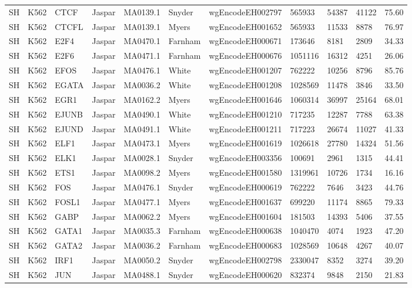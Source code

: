 {\begin{longtable}{p{0.2cm}p{1.1cm}p{1.0cm}p{1.0cm}p{1.0cm}p{1.0cm}p{2.3cm}p{1.0cm}p{0.8cm}p{0.8cm}p{0.8cm}}
SH & K562 & CTCF & Jaspar & MA0139.1 & Snyder & wgEncodeEH002797 & 565933 & 54387 & 41122 & 75.60\\
SH & K562 & CTCFL & Jaspar & MA0139.1 & Myers & wgEncodeEH001652 & 565933 & 11533 & 8878 & 76.97\\
SH & K562 & E2F4 & Jaspar & MA0470.1 & Farnham & wgEncodeEH000671 & 173646 & 8181 & 2809 & 34.33\\
SH & K562 & E2F6 & Jaspar & MA0471.1 & Farnham & wgEncodeEH000676 & 1051116 & 16312 & 4251 & 26.06\\
SH & K562 & EFOS & Jaspar & MA0476.1 & White & wgEncodeEH001207 & 762222 & 10256 & 8796 & 85.76\\
SH & K562 & EGATA & Jaspar & MA0036.2 & White & wgEncodeEH001208 & 1028569 & 11478 & 3846 & 33.50\\
SH & K562 & EGR1 & Jaspar & MA0162.2 & Myers & wgEncodeEH001646 & 1060314 & 36997 & 25164 & 68.01\\
SH & K562 & EJUNB & Jaspar & MA0490.1 & White & wgEncodeEH001210 & 717235 & 12287 & 7788 & 63.38\\
SH & K562 & EJUND & Jaspar & MA0491.1 & White & wgEncodeEH001211 & 717223 & 26674 & 11027 & 41.33\\
SH & K562 & ELF1 & Jaspar & MA0473.1 & Myers & wgEncodeEH001619 & 1026618 & 27780 & 14324 & 51.56\\
SH & K562 & ELK1 & Jaspar & MA0028.1 & Snyder & wgEncodeEH003356 & 100691 & 2961 & 1315 & 44.41\\
SH & K562 & ETS1 & Jaspar & MA0098.2 & Myers & wgEncodeEH001580 & 1319961 & 10726 & 1734 & 16.16\\
SH & K562 & FOS & Jaspar & MA0476.1 & Snyder & wgEncodeEH000619 & 762222 & 7646 & 3423 & 44.76\\
SH & K562 & FOSL1 & Jaspar & MA0477.1 & Myers & wgEncodeEH001637 & 699220 & 11174 & 8865 & 79.33\\
SH & K562 & GABP & Jaspar & MA0062.2 & Myers & wgEncodeEH001604 & 181503 & 14393 & 5406 & 37.55\\
SH & K562 & GATA1 & Jaspar & MA0035.3 & Farnham & wgEncodeEH000638 & 1040470 & 4074 & 1923 & 47.20\\
SH & K562 & GATA2 & Jaspar & MA0036.2 & Farnham & wgEncodeEH000683 & 1028569 & 10648 & 4267 & 40.07\\
SH & K562 & IRF1 & Jaspar & MA0050.2 & Snyder & wgEncodeEH002798 & 2330047 & 8352 & 3274 & 39.20\\
SH & K562 & JUN & Jaspar & MA0488.1 & Snyder & wgEncodeEH000620 & 832374 & 9848 & 2150 & 21.83\\

\end{longtable}}
